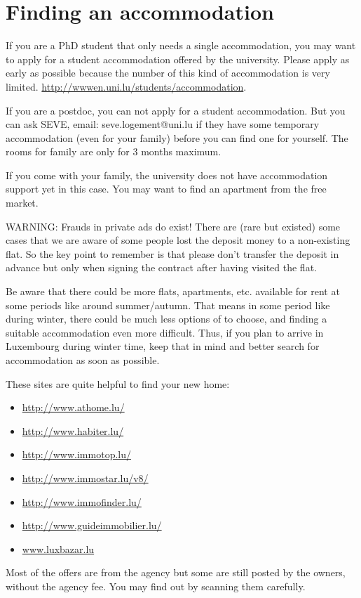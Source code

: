 \section{Finding an accommodation}
If you are a PhD student that only needs a single accommodation, you may want to apply for a student accommodation offered by the university. Please apply as early as possible because the number of this kind of accommodation is very limited.
\url{http://wwwen.uni.lu/students/accommodation}. 

If you are a postdoc, you can not apply for a student accommodation. 
But you can ask SEVE, email: seve.logement@uni.lu if they have some temporary accommodation (even for your family) before you can find one for yourself. 
The rooms for family are only for 3 months maximum.
 
If you come with your family, the university does not have accommodation support yet in this case. You may want to find an apartment from the free market. 

WARNING: Frauds in private ads do exist! There are (rare but existed) some cases that we are aware of some people lost the deposit money to a non-existing flat. So the key point to remember is that please don't transfer the deposit in advance but only when signing the contract after having visited the flat. 

Be aware that there could be more flats, apartments, etc. available for rent at some periods like around summer/autumn. 
That means in some period like during winter, there could be much less options of to choose, and finding a suitable accommodation even more difficult. 
Thus, if you plan to arrive in Luxembourg during winter time, keep that in mind and better search for accommodation as soon as possible. 

These sites are quite helpful to find your new home:
\begin{itemize}
	\item \url{http://www.athome.lu/}
	\item \url{http://www.habiter.lu/}
	\item \url{http://www.immotop.lu/}
	\item \url{http://www.immostar.lu/v8/}
	\item \url{http://www.immofinder.lu/}
	\item \url{http://www.guideimmobilier.lu/}
	\item \url{www.luxbazar.lu}
\end{itemize}

Most of the offers are from the agency but some are still posted by the owners, without the agency fee.
You may find out by scanning them carefully. 


